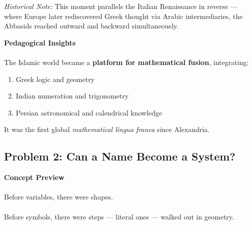 \documentclass[9pt]{article}
\begin{document}
\vspace{1em}

\textit{Historical Note:} This moment parallels the Italian Renaissance in reverse --- where Europe later rediscovered Greek thought via Arabic intermediaries, the Abbasids reached outward and backward simultaneously.

\vspace{1em}

\textbf{Pedagogical Insights} \\\\
The Islamic world became a \textbf{platform for mathematical fusion}, integrating:
\begin{enumerate}
    \item Greek logic and geometry
    \item Indian numeration and trigonometry
    \item Persian astronomical and calendrical knowledge
\end{enumerate}

It was the first global \textit{mathematical lingua franca} since Alexandria.

\vspace{1em}

\begin{center}
\end{center}


\newpage

\subsection*{Problem 2: Can a Name Become a System?}

\textbf{Concept Preview} \\\\
Before variables, there were shapes. \\\\
Before symbols, there were steps --- literal ones --- walked out in geometry.
\end{document}
